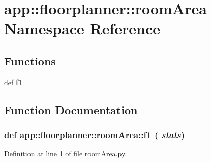 \section{app::floorplanner::roomArea Namespace Reference}
\label{namespaceapp_1_1floorplanner_1_1roomArea}


\subsection*{Functions}
\begin{CompactItemize}
\item 
def {\bf f1}
\end{CompactItemize}


\subsection{Function Documentation}
\subsubsection{\setlength{\rightskip}{0pt plus 5cm}def app::floorplanner::roomArea::f1 ( {\em stats})}\label{namespaceapp_1_1floorplanner_1_1roomArea_b313a66a6cacac9a3e0a238b052c95ae}




Definition at line 1 of file roomArea.py.